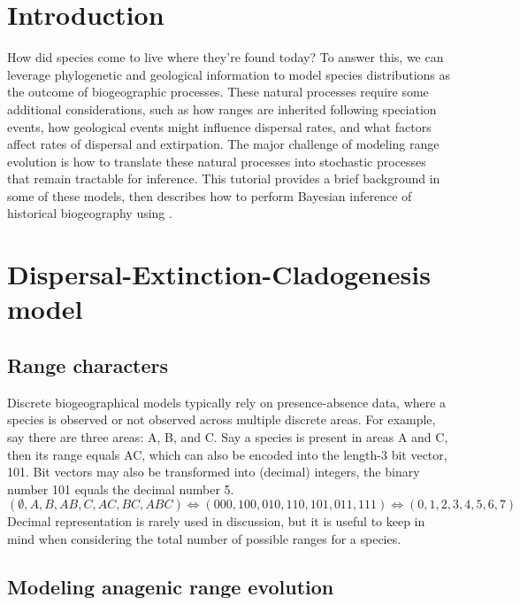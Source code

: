 \section{Introduction}

How did species come to live where they're found today?
To answer this, we can leverage phylogenetic and geological information to model species distributions as the outcome of biogeographic processes.
These natural processes require some additional considerations, such as how ranges are inherited following speciation events, how geological events might influence dispersal rates, and what factors affect rates of dispersal and extirpation.
The major challenge of modeling range evolution is how to translate these natural processes into stochastic processes that remain tractable for inference.
This tutorial provides a brief background in some of these models, then describes how to perform Bayesian inference of historical biogeography using \RevBayes.

\section{Dispersal-Extinction-Cladogenesis model}

\subsection{Range characters}

Discrete biogeographical models typically rely on presence-absence data, where a species is observed or not observed across multiple discrete areas.
For example, say there are three areas: A, B, and C.
Say a species is present in areas A and C, then its range equals AC, which can also be encoded into the length-3 bit vector, 101.
Bit vectors may also be transformed into (decimal) integers, \EG the binary number 101 equals the decimal number 5.
\[
( \emptyset, A, B, AB, C, AC, BC, ABC ) \Leftrightarrow (000,100,010,110,101,011,111) \Leftrightarrow ( 0, 1, 2, 3, 4, 5, 6, 7 )
\]
Decimal representation is rarely used in discussion, but it is useful to keep in mind when considering the total number of possible ranges for a species.

\subsection{Modeling anagenic range evolution}

